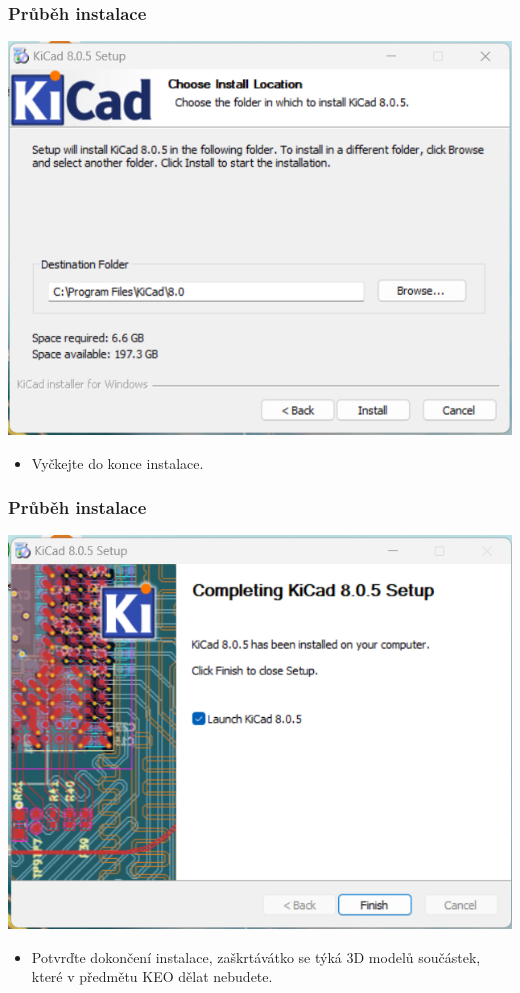 \documentclass{beamer}
\begin{document}
	\begin{frame}
    \frametitle{Průběh instalace}
		\begin{center}
			\includegraphics[scale=0.5]{obr/kicad_inst4.png}
		\end{center}
		
		\begin{itemize}
			\item Vyčkejte do konce instalace.
		\end{itemize}
	\end{frame}
	\begin{frame}
    \frametitle{Průběh instalace}
		\begin{center}
			\includegraphics[scale=0.5]{obr/kicad_inst5.png}
		\end{center}
		
		\begin{itemize}
			\item Potvrďte dokončení instalace, zaškrtávátko se týká 3D modelů součástek, které v předmětu KEO dělat nebudete.
		\end{itemize}
	\end{frame}
\end{document}
